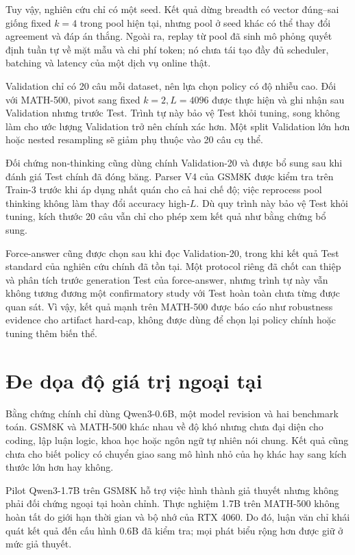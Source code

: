 Tuy vậy, nghiên cứu chỉ có một seed. Kết quả dừng breadth có vector đúng--sai
giống fixed $k=4$ trong pool hiện tại, nhưng pool ở seed khác có thể thay đổi
agreement và đáp án thắng. Ngoài ra, replay từ pool đã sinh mô phỏng quyết định
tuần tự về mặt mẫu và chi phí token; nó chưa tái tạo đầy đủ scheduler, batching
và latency của một dịch vụ online thật.

Validation chỉ có 20 câu mỗi dataset, nên lựa chọn policy có độ nhiễu cao. Đối
với MATH-500, pivot sang fixed $k=2,L=4096$ được thực hiện và ghi nhận sau
Validation nhưng trước Test. Trình tự này bảo vệ Test khỏi tuning, song không
làm cho ước lượng Validation trở nên chính xác hơn. Một split Validation lớn
hơn hoặc nested resampling sẽ giảm phụ thuộc vào 20 câu cụ thể.

Đối chứng non-thinking cũng dùng chính Validation-20 và được bổ sung sau khi
đánh giá Test chính đã đóng băng. Parser V4 của GSM8K được kiểm tra trên Train-3
trước khi áp dụng nhất quán cho cả hai chế độ; việc reprocess pool thinking
không làm thay đổi accuracy high-$L$. Dù quy trình này bảo vệ Test khỏi tuning,
kích thước 20 câu vẫn chỉ cho phép xem kết quả như bằng chứng bổ sung.

Force-answer cũng được chọn sau khi đọc Validation-20, trong khi kết quả Test
standard của nghiên cứu chính đã tồn tại. Một protocol riêng đã chốt can thiệp
và phân tích trước generation Test của force-answer, nhưng trình tự này vẫn
không tương đương một confirmatory study với Test hoàn toàn chưa từng được
quan sát. Vì vậy, kết quả mạnh trên MATH-500 được báo cáo như robustness
evidence cho artifact hard-cap, không được dùng để chọn lại policy chính hoặc
tuning thêm biến thể.

\section{Đe dọa độ giá trị ngoại tại}

Bằng chứng chính chỉ dùng Qwen3-0.6B, một model revision và hai benchmark toán.
GSM8K và MATH-500 khác nhau về độ khó nhưng chưa đại diện cho coding, lập luận
logic, khoa học hoặc ngôn ngữ tự nhiên nói chung. Kết quả cũng chưa cho biết
policy có chuyển giao sang mô hình nhỏ của họ khác hay sang kích thước lớn hơn
hay không.

Pilot Qwen3-1.7B trên GSM8K hỗ trợ việc hình thành giả thuyết nhưng không phải
đối chứng ngoại tại hoàn chỉnh. Thực nghiệm 1.7B trên MATH-500 không hoàn tất
do giới hạn thời gian và bộ nhớ của RTX 4060. Do đó, luận văn chỉ khái quát kết
quả đến cấu hình 0.6B đã kiểm tra; mọi phát biểu rộng hơn được giữ ở mức giả
thuyết.

